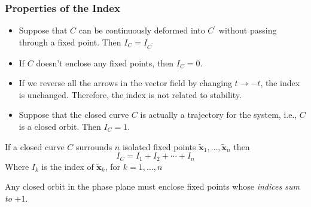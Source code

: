 \subsubsection{Properties of the Index}
\begin{itemize}
	\item Suppose that $C$ can be continuously deformed into $C^\prime$ without passing through a fixed point.
	Then $I_C=I_{C^\prime}$
	\item If $C$ doesn’t enclose any fixed points, then $I_C=0$.
	\item If we reverse all the arrows in the vector field by changing $t\rightarrow-t$, the index is unchanged.
	Therefore, the index is not related to stability.
	\item Suppose that the closed curve $C$ is actually a trajectory for the system, i.e., $C$ is a closed orbit.
	Then $I_C=1$.
\end{itemize}
\begin{theorem}
	If a closed curve $C$ surrounds $n$ isolated fixed points $\mathbf{\tilde{x}}_1,\ldots,\mathbf{\tilde{x}}_n$ then
	\begin{equation}
		I_C=I_1+I_2+\cdots+I_n
	\end{equation}
	Where $I_k$ is the index of $\mathbf{\tilde{x}}_k$, for $k=1,\ldots,n$
\end{theorem}
\begin{theorem}
	Any closed orbit in the phase plane must enclose fixed points whose \emph{indices sum to} $+1$.
\end{theorem}